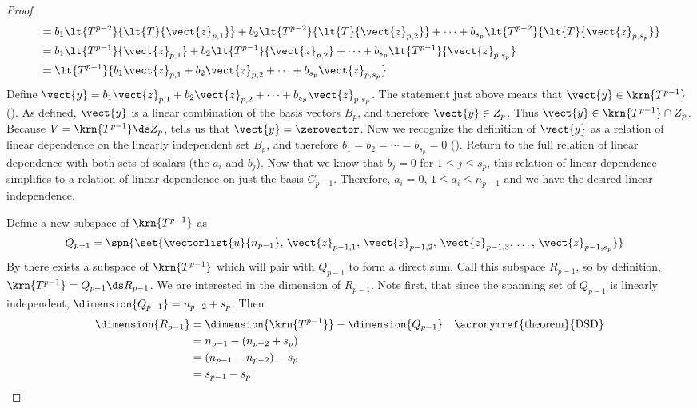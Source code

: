 \begin{proof}
\begin{align*}
%
&=
b_1\lt{T^{p-2}}{\lt{T}{\vect{z}_{p,1}}}+
b_2\lt{T^{p-2}}{\lt{T}{\vect{z}_{p,2}}}+
\cdots+
b_{s_p}\lt{T^{p-2}}{\lt{T}{\vect{z}_{p,s_p}}}\\
%
&=
b_1\lt{T^{p-1}}{\vect{z}_{p,1}}+
b_2\lt{T^{p-1}}{\vect{z}_{p,2}}+
\cdots+
b_{s_p}\lt{T^{p-1}}{\vect{z}_{p,s_p}}\\
%
&=
\lt{T^{p-1}}{
b_1\vect{z}_{p,1}+
b_2\vect{z}_{p,2}+
\cdots+
b_{s_p}\vect{z}_{p,s_p}
}
\end{align*}
%
Define 
$\vect{y}=
b_1\vect{z}_{p,1}+b_2\vect{z}_{p,2}+\cdots+b_{s_p}\vect{z}_{p,s_p}$.  
The statement just above means that $\vect{y}\in\krn{T^{p-1}}$  ().  As defined, $\vect{y}$ is a linear combination of the basis vectors $B_p$, and therefore $\vect{y}\in Z_p$.  Thus $\vect{y}\in\krn{T^{p-1}}\cap Z_p$.  Because $V=\krn{T^{p-1}}\ds Z_p$,  tells us that $\vect{y}=\zerovector$.  Now we recognize the definition of $\vect{y}$ as a relation of linear dependence on the linearly independent set $B_p$, and therefore $b_1=b_2=\cdots=b_{s_p}=0$ ().  Return to the full relation of linear dependence with both sets of scalars (the $a_i$ and $b_j$).  Now that we know that $b_j=0$ for $1\leq j\leq s_p$, this relation of linear dependence simplifies to a relation of linear dependence on just the basis $C_{p-1}$.  Therefore, $a_i=0$, $1\leq a_i\leq n_{p-1}$ and we have the desired linear independence.\par
%
Define a new subspace of $\krn{T^{p-1}}$ as
%
\begin{align*}
Q_{p-1}
&=
\spn{\set{
\vectorlist{u}{n_{p-1}},\,
\vect{z}_{p-1,1},\,\vect{z}_{p-1,2},\,\vect{z}_{p-1,3},\,\dots,\,\vect{z}_{p-1,s_p}
}}
\end{align*}
%
By  there exists a subspace of $\krn{T^{p-1}}$ which will pair with $Q_{p-1}$ to form a direct sum.  Call this subspace $R_{p-1}$, so by definition, $\krn{T^{p-1}}=Q_{p-1}\ds R_{p-1}$.  We are interested in the dimension of $R_{p-1}$.  Note first, that since the spanning set of $Q_{p-1}$ is linearly independent, $\dimension{Q_{p-1}}=n_{p-2}+s_p$.  Then
%
\begin{align*}
\dimension{R_{p-1}}
&=\dimension{\krn{T^{p-1}}}-\dimension{Q_{p-1}}&&\text{\acronymref{theorem}{DSD}}\\
&=n_{p-1}-\left(n_{p-2}+s_p\right)\\
&=\left(n_{p-1}-n_{p-2}\right)-s_p\\
&=s_{p-1}-s_p
\end{align*}

\end{proof}
